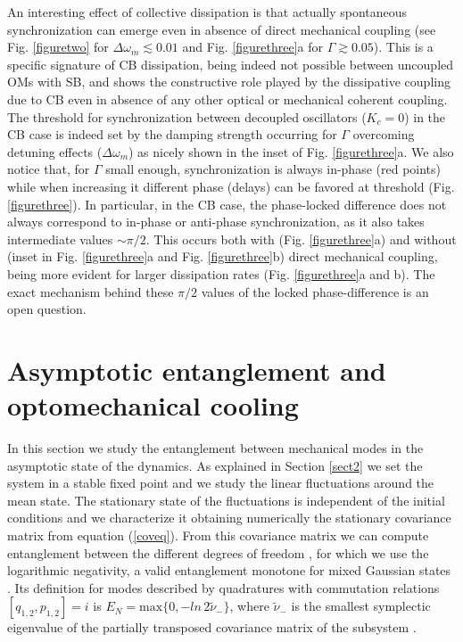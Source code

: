 \documentclass[a4paper]{jpconf}
\begin{document}
 An interesting effect of collective dissipation is that actually spontaneous synchronization can emerge even in absence of direct
 mechanical coupling (see Fig. \ref{figuretwo} for $\Delta\omega_m\lesssim 0.01$ and Fig. \ref{figurethree}a for $\Gamma\gtrsim 0.05$). 
 This is a specific signature of CB dissipation,
 being indeed not possible between uncoupled OMs with SB, and  shows the constructive role played by the 
 dissipative coupling due to CB even in absence of any other optical or mechanical coherent coupling.
The threshold for synchronization between decoupled oscillators ($K_c=0$) in the CB case is indeed set by the damping strength occurring for $\Gamma$ overcoming detuning effects
($\Delta \omega_m$) as nicely shown in the inset of  Fig. \ref{figurethree}a.
We also notice that, for $\Gamma$  small enough, synchronization is always in-phase (red points)
while when increasing it different phase (delays) can be favored at threshold (Fig. \ref{figurethree}).  In particular, in the CB case, 
the phase-locked difference does not always correspond to in-phase or anti-phase synchronization, as it also takes intermediate values  $\sim\pi/2$. This occurs both
with (Fig. \ref{figurethree}a) and without (inset in Fig. \ref{figurethree}a and Fig. \ref{figurethree}b) direct mechanical coupling, 
being more evident for larger dissipation rates (Fig. \ref{figurethree}a and b). The exact mechanism behind these $\pi/2$ values of the
locked phase-difference is an open question.

\section{Asymptotic entanglement and optomechanical cooling}
\label{sect4}

In this section we study the entanglement between mechanical modes in the asymptotic state of the dynamics. As explained in Section \ref{sect2} we set the system 
in a stable fixed point and we study the linear fluctuations around the mean 
state. The stationary state of the fluctuations is independent of the initial 
conditions and we characterize it obtaining numerically the stationary 
covariance matrix from equation (\ref{coveq}). From this covariance matrix we can compute entanglement between the 
different degrees of freedom \cite{50,51}, for which we use the logarithmic negativity, a valid 
entanglement monotone for mixed Gaussian states \cite{50,51}. Its definition for modes described by 
quadratures with commutation relations $[q_{1,2},p_{1,2}]=i$ is 
$E_N=\mathrm{max}\{0,-ln\,2\tilde{\nu}_-\}$, where $\tilde{\nu}_-$ is the smallest 
symplectic eigenvalue of the partially transposed covariance matrix of the 
subsystem \cite{51}.
\end{document}
